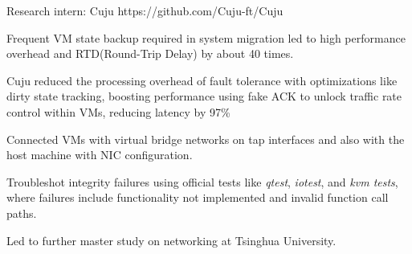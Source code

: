 
\vspace{-2mm}

\begin{cventries}

  
\cventry
  {} %
  {Research intern: Cuju} %
  {} %
  {https://github.com/Cuju-ft/Cuju} %
  {
    \vspace{-2mm}
    \begin{cvitems} %
      \item {Frequent VM state backup required in system migration led to high performance overhead and RTD(Round-Trip Delay) by about 40 times.}
      \item {Cuju reduced the processing overhead of fault tolerance with optimizations like dirty state tracking, boosting performance using fake ACK to unlock traffic rate control within VMs, reducing latency by 97\%}
      \item {Connected VMs with virtual bridge networks on tap interfaces and also with the host machine with NIC configuration.}
      \item {Troubleshot integrity failures using official tests like \emph{qtest}, \emph{iotest}, and \emph{kvm tests}, where failures include functionality not implemented and invalid function call paths. }
      \item {Led to further master study on networking at Tsinghua University.}
    \end{cvitems}
  }

  \vspace{-3mm}


\end{cventries}
